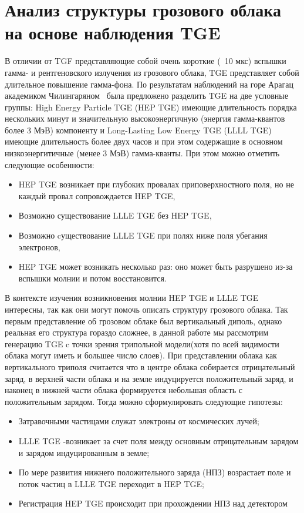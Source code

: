\section{Анализ структуры грозового облака на основе наблюдения TGE}\label{sec:thunderstorm/llletge} 
В отличии от TGF представляющие собой очень короткие (~10 мкс) вспышки гамма- и рентгеновского излучения из грозового облака, TGE представляет собой длительное повышение гамма-фона. По результатам наблюдений на горе Арагац академиком Чилингаряном~\cite{PhysRevD.98.082001} была предложено разделить TGE на две условные группы: High Energy Particle TGE (HEP TGE) имеющие длительность порядка нескольких минут и значительную высокоэнергичную (энергия гамма-квантов более 3 МэВ) компоненту и Long-Lasting Low Energy TGE (LLLL TGE) имеющие длительность более двух часов и при этом содержащие в основном низкоэнергитичные (менее 3 МэВ) гамма-кванты. При этом можно отметить следующие особенности: 
\begin{itemize}
    \item HEP TGE  возникает при глубоких  провалах  приповерхностного поля, но не каждый провал сопровождается HEP TGE,
    \item Возможно существование LLLE TGE без  HEP TGE,
    \item Возможно cуществование LLLE TGE при полях ниже поля убегания электронов,
    \item HEP TGE может возникать несколько раз: оно может быть разрушено из-за вспышки молнии и потом восстановится.
\end{itemize}
В контексте изучения возникновения молнии HEP TGE и LLLE TGE интересны, так как они могут помочь описать структуру грозового облака.  Так первым представление об грозовом облаке был вертикальный диполь, однако реальная его структура гораздо сложнее, в данной работе мы рассмотрим генерацию TGE c точки зрения трипольной модели(хотя по всей видимости облака могут иметь и большее число слоев). При представлении облака как вертикального триполя считается что в центре облака собирается отрицательный заряд, в верхней части облака и на земле индуцируется положительный заряд, и наконец в нижней части облака формируется небольшая область с положительным зарядом. Тогда можно сформулировать следующие гипотезы:
\begin{itemize}
    \item Затравочными частицами служат электроны от космических лучей;
    \item LLLE TGE -возникает за счет поля между основным отрицательным зарядом и зарядом индуцированным в земле;
    \item По мере развития нижнего положительного заряда (НПЗ)  возрастает поле и поток частиц в LLLE TGE переходит в HEP TGE;
    \item Регистрация HEP TGE происходит при прохождении НПЗ над детектором
\end{itemize}
